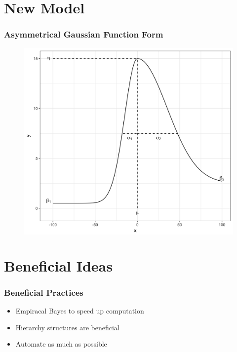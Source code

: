 \documentclass{beamer}\usepackage[]{graphicx}\usepackage[]{color}
\begin{document}
\section{New Model}
\begin{frame}
\frametitle{Asymmetrical Gaussian Function Form}
\begin{figure}[!ht]
  \includegraphics[width=0.70\linewidth]{Figures/ASGFunctFormPlot.png}
\end{figure}

\end{frame}



\section{Beneficial Ideas}
\begin{frame}
\frametitle{Beneficial Practices}

\begin{itemize}
\item Empiracal Bayes to speed up computation
\item Hierarchy structures are beneficial
\item Automate as much as possible
\end{itemize}

\end{frame}
\end{document}
